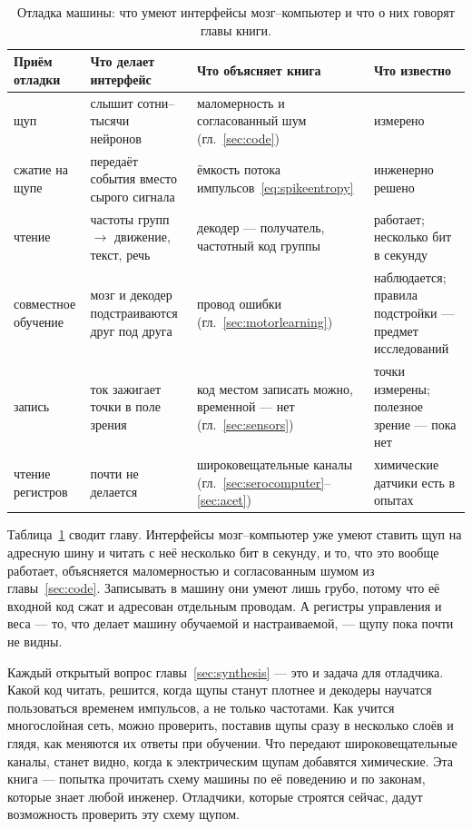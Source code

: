 \begin{table}[t]
\centering
\footnotesize
\setlength{\tabcolsep}{4pt}
\renewcommand{\arraystretch}{1.15}
\begin{tabular}{>{\raggedright}p{2.2cm}>{\raggedright}p{3.6cm}>{\raggedright}p{3.4cm}>{\raggedright\arraybackslash}p{4.0cm}}
\toprule
Приём отладки & Что делает интерфейс & Что объясняет книга & Что известно \\
\midrule
щуп & слышит сотни--тысячи нейронов & маломерность и согласованный шум (гл.~\ref{sec:code}) & измерено \\
сжатие на щупе & передаёт события вместо сырого сигнала & ёмкость потока импульсов~\eqref{eq:spikeentropy} & инженерно решено \\
чтение & частоты групп $\to$ движение, текст, речь & декодер --- получатель, частотный код группы & работает; несколько бит в секунду \\
совместное обучение & мозг и декодер подстраиваются друг под друга & провод ошибки (гл.~\ref{sec:motorlearning}) & наблюдается; правила подстройки --- предмет исследований \\
запись & ток зажигает точки в поле зрения & код местом записать можно, временной --- нет (гл.~\ref{sec:sensors}) & точки измерены; полезное зрение --- пока нет \\
чтение регистров & почти не делается & широковещательные каналы (гл.~\ref{sec:serocomputer}--\ref{sec:acet}) & химические датчики есть в опытах \\
\bottomrule
\end{tabular}
\caption{Отладка машины: что умеют интерфейсы мозг--компьютер и что о них говорят главы книги.}
\label{tab:debugging}
\end{table}

Таблица~\ref{tab:debugging} сводит главу. Интерфейсы мозг--компьютер уже умеют ставить щуп на адресную шину и читать с неё несколько бит в секунду, и то, что это вообще работает, объясняется маломерностью и согласованным шумом из главы~\ref{sec:code}. Записывать в машину они умеют лишь грубо, потому что её входной код сжат и адресован отдельным проводам. А регистры управления и веса --- то, что делает машину обучаемой и настраиваемой, --- щупу пока почти не видны.

Каждый открытый вопрос главы~\ref{sec:synthesis} --- это и задача для отладчика. Какой код читать, решится, когда щупы станут плотнее и декодеры научатся пользоваться временем импульсов, а не только частотами. Как учится многослойная сеть, можно проверить, поставив щупы сразу в несколько слоёв и глядя, как меняются их ответы при обучении. Что передают широковещательные каналы, станет видно, когда к электрическим щупам добавятся химические. Эта книга --- попытка прочитать схему машины по её поведению и по законам, которые знает любой инженер. Отладчики, которые строятся сейчас, дадут возможность проверить эту схему щупом.
